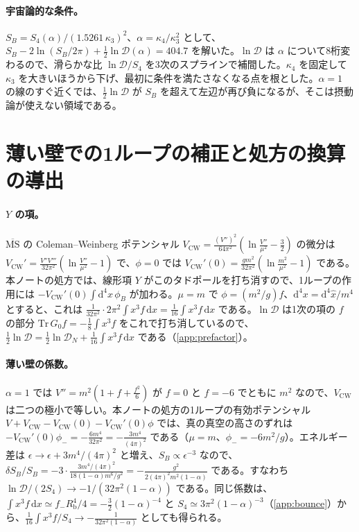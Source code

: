 \documentclass[a4paper,10pt]{ltjsarticle}
\newcommand{\dd}{\mathrm{d}}
\begin{document}
\paragraph{宇宙論的な条件。}$S_B=S_4(\alpha)/(1.5261\,\kappa_3)^2$、$\alpha=\kappa_4/\kappa_3^2$ として、$S_B-2\ln(S_B/2\pi)+\frac12\ln\mathcal D(\alpha)=404.7$ を解いた。$\ln\mathcal D$ は $\alpha$ について8桁変わるので、滑らかな比 $\ln\mathcal D/S_4$ を3次のスプラインで補間した。$\kappa_4$ を固定して $\kappa_3$ を大きいほうから下げ、最初に条件を満たさなくなる点を根とした。$\alpha=1$ の線のすぐ近くでは、$\frac12\ln\mathcal D$ が $S_B$ を超えて左辺が再び負になるが、そこは摂動論が使えない領域である。

\section{薄い壁での1ループの補正と処方の換算の導出}\label{app:thinwall}

\paragraph{$Y$ の項。}$\overline{\mathrm{MS}}$ の Coleman--Weinberg ポテンシャル $V_{\mathrm{CW}}=\frac{(V'')^2}{64\pi^2}(\ln\frac{V''}{\mu^2}-\frac32)$ の微分は $V_{\mathrm{CW}}'=\frac{V''V'''}{32\pi^2}(\ln\frac{V''}{\mu^2}-1)$ で、$\phi=0$ では $V_{\mathrm{CW}}'(0)=\frac{gm^2}{32\pi^2}(\ln\frac{m^2}{\mu^2}-1)$ である。本ノートの処方では、線形項 $Y$ がこのタドポールを打ち消すので、1ループの作用には $-V_{\mathrm{CW}}'(0)\int\dd^4x\,\phi_B$ が加わる。$\mu=m$ で $\phi=(m^2/g)f$、$\dd^4x=\dd^4\hat x/m^4$ とすると、これは $\frac{1}{32\pi^2}\cdot2\pi^2\int x^3f\,\dd x=\frac1{16}\int x^3f\,\dd x$ である。$\ln\mathcal D$ は1次の項の $f$ の部分 $\mathrm{Tr}\,G_0f=-\frac18\int x^3f$ をこれで打ち消しているので、$\frac12\ln\mathcal D=\frac12\ln\mathcal D_N+\frac1{16}\int x^3f\,\dd x$ である（\ref{app:prefactor}）。

\paragraph{薄い壁の係数。}$\alpha=1$ では $V''=m^2(1+f+\frac{f^2}6)$ が $f=0$ と $f=-6$ でともに $m^2$ なので、$V_{\mathrm{CW}}$ は二つの極小で等しい。本ノートの処方の1ループの有効ポテンシャル $V+V_{\mathrm{CW}}-V_{\mathrm{CW}}(0)-V_{\mathrm{CW}}'(0)\phi$ では、真の真空の高さのずれは $-V_{\mathrm{CW}}'(0)\phi_-=-\frac{6m^4}{32\pi^2}=-\frac{3m^4}{(4\pi)^2}$ である（$\mu=m$、$\phi_-=-6m^2/g$）。エネルギー差は $\epsilon\to\epsilon+3m^4/(4\pi)^2$ と増え、$S_B\propto\epsilon^{-3}$ なので、$\delta S_B/S_B=-3\cdot\frac{3m^4/(4\pi)^2}{18(1-\alpha)m^6/g^2}=-\frac{g^2}{2(4\pi)^2m^2(1-\alpha)}$ である。すなわち $\ln\mathcal D/(2S_4)\to-1/(32\pi^2(1-\alpha))$ である。同じ係数は、$\int x^3f\,\dd x\simeq f_-R_{\mathrm b}^4/4=-\frac32(1-\alpha)^{-4}$ と $S_4\simeq3\pi^2(1-\alpha)^{-3}$（\ref{app:bounce}）から、$\frac1{16}\int x^3f/S_4\to-\frac{1}{32\pi^2(1-\alpha)}$ としても得られる。
\end{document}
